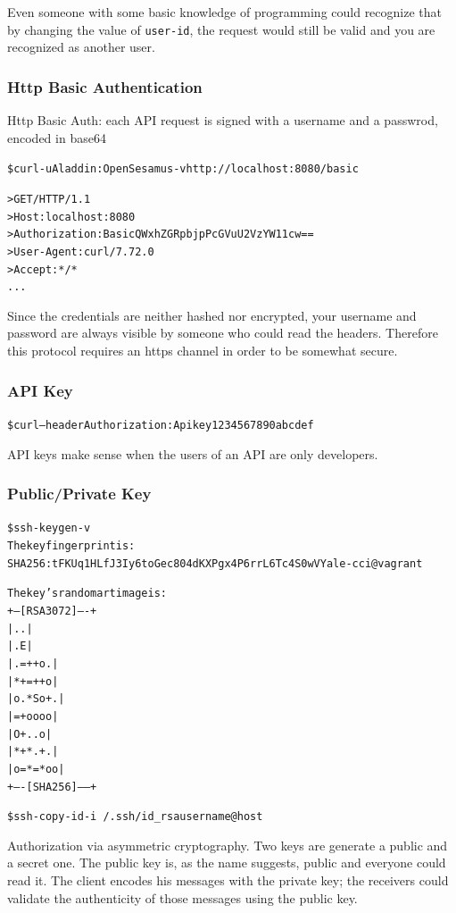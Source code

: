 \documentclass[11pt]{style}
\begin{document}
Even someone with some basic knowledge of programming could recognize that by changing the
value of \texttt{user-id}, the request would still be valid and you are recognized as
another user.

\subsubsection{Http Basic Authentication}
Http Basic Auth: each API request is signed with a username and a passwrod, encoded in base64
\begin{alltt}
    \$ curl -u Aladdin:OpenSesamus -v http://localhost:8080/basic

    > GET / HTTP/1.1
    > Host: localhost:8080
    > Authorization: Basic QWxhZGRpbjpPcGVuU2VzYW11cw==
    > User-Agent: curl/7.72.0
    > Accept: */*
    ...
\end{alltt}
Since the credentials are neither hashed nor encrypted, your username and password are always visible by
someone who could read the headers.
Therefore this protocol requires an https channel in order to be somewhat secure.

\subsubsection{API Key}
\begin{alltt}
    \$ curl --header Authorization: Apikey 1234567890abcdef
\end{alltt}
API keys make sense when the users of an API are only developers.

\subsubsection{Public/Private Key}
\begin{alltt}
    \$ ssh-keygen -v
    The key fingerprint is:
    SHA256:tFKUq1HLfJ3Iy6toGec804dKXPgx4P6rrL6Tc4S0wVY ale-cci@vagrant

    The key's randomart image is:
    +---[RSA 3072]----+
    |        ..       |
    |       .E        |
    |     . =++ o .   |
    |      *+=++ o    |
    |     o.*So+.     |
    |      =+oooo     |
    |       O+..o     |
    |      *+*.+ .    |
    |     o=*=*oo     |
    +----[SHA256]-----+


    \$ ssh-copy-id -i ~/.ssh/id_rsa username@host
\end{alltt}
Authorization via asymmetric cryptography. Two keys are generate a public and a secret one.
The public key is, as the name suggests, public and everyone could read it.
The client encodes his messages with the private key; the receivers could validate the authenticity of those messages using the public key.
\end{document}
